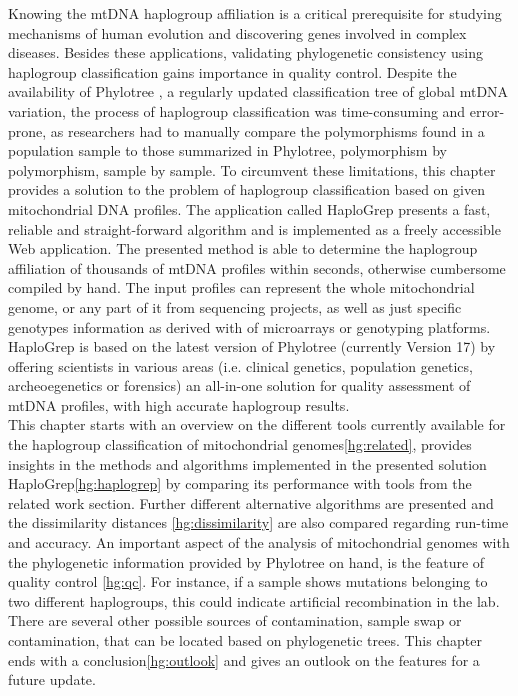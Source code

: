 Knowing the mtDNA haplogroup affiliation is a critical prerequisite \cite{Kloss-Brandstatter2011} for studying mechanisms of human evolution and discovering genes involved in complex diseases. Besides these applications, validating phylogenetic consistency using haplogroup classification gains importance in quality control. Despite the availability of Phylotree \cite{VanOven2009}, a regularly updated classification tree of global mtDNA variation, the process of haplogroup classification was time-consuming and error-prone, as researchers had to manually compare the polymorphisms found in a population sample to those summarized in Phylotree, polymorphism by polymorphism, sample by sample. To circumvent these limitations, this chapter provides a solution to the problem of haplogroup classification based on given mitochondrial DNA profiles. The application called HaploGrep presents a fast, reliable and straight-forward algorithm and is implemented as a freely accessible Web application. The presented method is able to determine the haplogroup affiliation of thousands of mtDNA profiles within seconds, otherwise cumbersome compiled by hand. The input profiles can represent the whole mitochondrial genome, or any part of it from sequencing projects, as well as just specific genotypes information as derived with of microarrays or genotyping platforms. HaploGrep is based on the latest version of Phylotree (currently Version 17) by offering scientists in various areas (i.e. clinical genetics, population genetics, archeoegenetics or forensics) an all-in-one solution for quality assessment of mtDNA profiles, with high accurate haplogroup results. \\
This chapter starts with an overview on the different tools currently available for the haplogroup classification of mitochondrial genomes\ref{hg:related}, provides insights in the methods and algorithms implemented in the presented solution HaploGrep\ref{hg:haplogrep} by comparing its performance with tools from the related work section. Further different alternative algorithms are presented and the dissimilarity distances \ref{hg:dissimilarity} are also compared regarding run-time and accuracy. An important aspect of the analysis of mitochondrial genomes with the phylogenetic information provided by Phylotree on hand, is the feature of quality control \ref{hg:qc}. For instance, if a sample shows mutations belonging to two different haplogroups, this could indicate artificial recombination in the lab. There are several other possible sources of contamination, sample swap or contamination, that can be located based on phylogenetic trees. This chapter ends with a conclusion\ref{hg:outlook} and gives an outlook on the features for a future update.  
